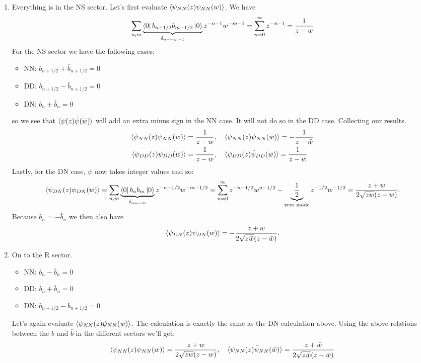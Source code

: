 \documentclass[11pt]{article}
\begin{document}
\begin{enumerate}
	\item Everything is in the NS sector. Let's first evaluate $\braket{\psi_{NN}(z) \psi_{NN} (w)}$. We have
	\[
		\sum_{n,m} \underbrace{\bra{0} b_{n+1/2} b_{m+1/2} \ket{0}}_{\delta_{n=-m-1}} z^{-n-1} w^{-m-1} = \sum_{n=0}^\infty z^{-n-1} = \frac{1}{z-w}
	\]
	For the NS sector we have the following cases:
	\begin{itemize}
		\item NN: $b_{n+1/2} + \bar b_{n+1/2} = 0$
		\item DD: $b_{n+1/2} -\bar b_{n+1/2} = 0$
		\item DN: $b_n + \bar b_n = 0$
	\end{itemize}
	so we see that $\braket{\psi(z) \bar \psi(\bar w)}$ will add an extra minus sign in the NN case. It will not do so in the DD case. Collecting our results. 
	\[
	\begin{aligned}
		\braket{\psi_{NN}(z) \psi_{NN} (w)} &= \frac{1}{z-w}, \quad 
		\braket{\psi_{NN}(z) \bar \psi_{NN} (\bar w)} = -\frac{1}{z-\bar w} \\
		\braket{\psi_{DD}(z) \psi_{DD} (w)} &= \frac{1}{z-w}, \quad 
		\braket{\psi_{DD}(z) \bar \psi_{DD} (\bar w)} = \frac{1}{z-\bar w}\\
	\end{aligned}
	\]
	Lastly, for the DN case, $\psi$ now takes integer values and so:
	\[
		\braket{\psi_{DN}(z) \psi_{DN} (w)} = \sum_{n, m} \underbrace{\bra{0} b_n b_m \ket{0}}_{\delta_{n=-m}} z^{-n-1/2} w^{-m-1/2} = \sum_{n=0}^\infty z^{-n-1/2} w^{n-1/2} - \underbrace{\frac12}_{\text{zero mode}} z^{-1/2} w^{-1/2} = \frac{z+w}{2 \sqrt{z w} (z - w)}.
	\]
	Because $b_n = -\bar b_n$ we then also have
	\[
		\braket{\psi_{DN}(z) \bar \psi_{DN} (\bar w)} = - \frac{z+\bar w}{2 \sqrt{z \bar w} (z - \bar w)}.
	\]
	\item 
	On to the R sector.
	\begin{itemize}
		\item NN: $b_{n} - \bar b_n = 0$
		\item DD: $b_{n} + \bar b_n = 0$
		\item DN: $b_{n+1/2} - \bar b_{n+1/2} = 0$
	\end{itemize}
	 Let's again evaluate $\braket{\psi_{NN}(z) \psi_{NN} (w)}$. The calculation is exactly the same as the DN calculation above. Using the above relations between the $b$ and $\bar b$ in the different sectors we'll get:
	\[
	\begin{aligned}
		\braket{\psi_{NN}(z) \psi_{NN} (w)} &= \frac{z+w}{2 \sqrt{z w} (z - w)}, \quad 
		\braket{\psi_{NN}(z) \bar \psi_{NN} (\bar w)} = \frac{z+\bar w}{2 \sqrt{z \bar w} (z - \bar w)} \\

\end{aligned}\]
\end{enumerate}
\end{document}
